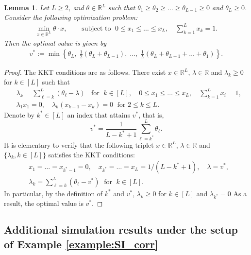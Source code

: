 \documentclass[aap,preprint]{imsart}
\newcommand{\bR}{{\mathbb{R}}}
\theoremstyle{plain}
\newtheorem{lemma}[theorem]{Lemma}
\theoremstyle{definition}
\begin{document}
\begin{appendix}
\begin{lemma} \label{lemma:ordering_opt2}
Let $L \geq 2$, and $\theta \in \bR^L$ such that $\theta_1 \geq \theta_2 \geq \ldots \geq \theta_{L-1} \geq 0$ and $\theta_{L} \geq 0$. Consider the following optimization problem:
\begin{align*}
    \min_{x \in \bR^L} \theta \cdot x, \quad &\text{ subject to } \; 0 \leq x_1  \leq \ldots \leq x_{L}, \quad
     \sum_{k =1}^{L} x_k = 1.
\end{align*}
Then the optimal value is given by
\begin{align*}
  v^*  :=   \min\left\{
    {\theta}_L,\; \frac{1}{2}({\theta}_L + {\theta}_{L-1}),\; \ldots,\; \frac{1}{L}\left({\theta}_L + {\theta}_{L-1} +  \ldots + \theta_{1} \right)
    \right\}.
\end{align*}
\end{lemma}
\begin{proof}
The KKT conditions are as follows. There exist $x \in \bR^L$, $\lambda \in \bR$ and $\lambda_k \geq 0$ for $k \in [L]$ such that
\begin{align*}
&\lambda_k = \sum_{\ell=k}^{L} (\theta_\ell - \lambda) \;\; \text{ for } \;k \in [L],\quad  0 \leq x_1  \leq \ldots \leq x_{L}, \quad \sum_{k=1}^{L} x_i = 1,\\
& \lambda_1 x_1 = 0, \quad
\lambda_k(x_{k-1} - x_{k}) = 0 \;\text{ for } 2 \leq k \leq L.
\end{align*}
Denote by $k^* \in [L]$ an index that attains $v^*$, that is,
$$
v^* = \frac{1}{L-k^*+1} {\sum_{\ell=k^*}^{L} \theta_\ell}.
$$
It is elementary to verify that the following triplet $x \in \bR^L$, $\lambda \in \bR$ and $\{\lambda_{k}, k \in [L]\}$ satisfies the KKT conditions:
\begin{align*}
&x_1 = \ldots = x_{k^*-1} = 0, \quad x_{k^*} = \ldots = x_L = 1/(L-k^*+1), \quad \lambda = v^*,\\
&\lambda_k = \sum_{\ell=k}^{L} (\theta_\ell - v^*)\; \text{ for } \; k\in [L].
\end{align*}
In particular, by the definition of $k^*$ and $v^*$, $\lambda_k \geq 0$ for $k \in [L]$ and $\lambda_{k^*} = 0 $ As a result, the optimal value is $v^*$.
\end{proof}



\subsection{Additional simulation results under the setup of Example \ref{example:SI_corr}} \label{app:SI_corrnormal_more_sim}


\end{appendix}
\end{document}

